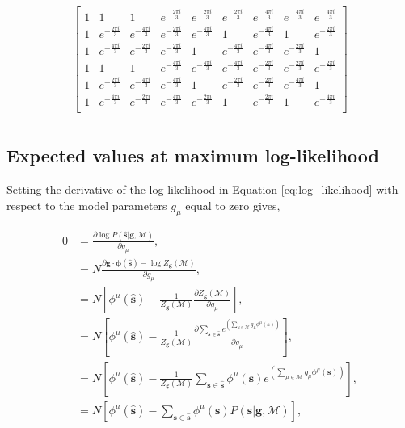 \begin{landscape}
\begin{align*}
\begin{bmatrix}
        1 & 1 & 1 & e^{-\frac{2\pi i}{3}} & e^{-\frac{2\pi i}{3}} & e^{-\frac{2\pi i}{3}} & e^{-\frac{4\pi i}{3}} & e^{-\frac{4\pi i}{3}} & e^{-\frac{4\pi i}{3}} \\
        1 & e^{-\frac{2\pi i}{3}} & e^{-\frac{4\pi i}{3}} & e^{-\frac{2\pi i}{3}} & e^{-\frac{4\pi i}{3}} & 1 & e^{-\frac{4\pi i}{3}} & 1 & e^{-\frac{2\pi i}{3}} \\
        1 & e^{-\frac{4\pi i}{3}} & e^{-\frac{2\pi i}{3}} & e^{-\frac{2\pi i}{3}} & 1 & e^{-\frac{4\pi i}{3}} & e^{-\frac{4\pi i}{3}} & e^{-\frac{2\pi i}{3}} & 1 \\
        1 & 1 & 1 & e^{-\frac{4\pi i}{3}} & e^{-\frac{4\pi i}{3}} & e^{-\frac{4\pi i}{3}} & e^{-\frac{2\pi i}{3}} & e^{-\frac{2\pi i}{3}} & e^{-\frac{2\pi i}{3}} \\
        1 & e^{-\frac{2\pi i}{3}} & e^{-\frac{4\pi i}{3}} & e^{-\frac{4\pi i}{3}} & 1 & e^{-\frac{2\pi i}{3}} & e^{-\frac{2\pi i}{3}} & e^{-\frac{4\pi i}{3}} & 1 \\
        1 & e^{-\frac{4\pi i}{3}} & e^{-\frac{2\pi i}{3}} & e^{-\frac{4\pi i}{3}} & e^{-\frac{2\pi i}{3}} & 1 & e^{-\frac{2\pi i}{3}} & 1 & e^{-\frac{4\pi i}{3}} \\
    \end{bmatrix}\\
\end{align*}
\restoregeometry
\end{landscape}

\subsection{Expected values at maximum log-likelihood} \label{sec:max_log_likelihood}

Setting the derivative of the log-likelihood in Equation \ref{eq:log_likelihood} with respect to the model parameters $g_\mu$ equal to zero gives,

\begin{align*}
    0 &= \frac{\partial \log P(\mathbf{\hat{s}} | \mathbf{g}, \mathcal{M})}{\partial g_\mu}, \\
    &= N \frac{\partial  \mathbf{g} \cdot \mathbf{\phi}(\mathbf{\hat{s}}) - \log {Z_\mathbf{g}(\mathcal{M})}}{\partial g_\mu}, \\
    &= N \left[ \phi^\mu(\mathbf{\hat{s}}) - \frac{1}{Z_\mathbf{g}(\mathcal{M})} \frac{\partial {Z_\mathbf{g}(\mathcal{M})}}{\partial g_\mu} \right], \\
    &= N \left[ \phi^\mu(\mathbf{\hat{s}}) - \frac{1}{Z_\mathbf{g}(\mathcal{M})} \frac{\partial \sum_{\mathbf{s} \in \mathbf{\hat{s}}} e^{\left(\sum_{\mu \in \mathcal{M}} g_\mu \phi^\mu(\mathbf{s}) \right)}}{\partial g_\mu} \right], \\
    &= N \left[ \phi^\mu(\mathbf{\hat{s}}) - \frac{1}{Z_\mathbf{g}(\mathcal{M})} \sum_{\mathbf{s} \in \mathbf{\hat{s}}} \phi^\mu(\mathbf{s}) e^{\left(\sum_{\mu \in \mathcal{M}} g_\mu \phi^\mu(\mathbf{s}) \right)} \right], \\
    &= N \left[ \phi^\mu(\mathbf{\hat{s}}) - \sum_{\mathbf{s} \in \mathbf{\hat{s}}} \phi^\mu(\mathbf{s}) P(\mathbf{s} | \mathbf{g}, \mathcal{M})\right],
\end{align*}

